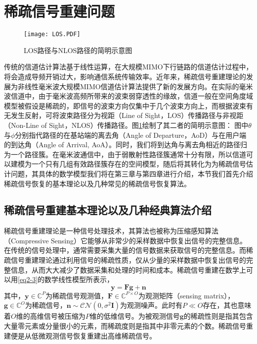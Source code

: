 \documentclass{xdupgthesis}
\begin{document}
\section{稀疏信号重建问题}
\begin{figure}[!ht]
    \centering
    \texttt{[image: LOS.PDF]}
    \caption{LOS路径与NLOS路径的简明示意图}
    \label{LOS}
\end{figure}
传统的信道估计算法基于线性运算，在大规模MIMO下行链路的信道估计过程中，将会造成导频开销过大，影响通信系统传输效率。近年来，稀疏信号重建理论的发展为非线性毫米波大规模MIMO信道估计算法提供了新的发展方向。在实际的毫米波信道中，由于毫米波高频所带来的波束弱穿透性的缘故，信道一般在空间角度域模型被假设是稀疏的，即信号的波束方向仅集中于几个波束方向上，而根据波束有无发生反射，可将波束路径分为视距（Line of Sight，LOS）传播路径与非视距（Non-Line of Sight，NLOS）传播路径。图\ref{LOS}绘制了其二者的简明示意图：
图中$\theta$与$\phi$分别指代路径的在基站端的离去角（Angle of Departure，AoD）与在用户端的到达角（Angle of Arrival, AoA）。同时，我们将到达角与离去角相近的路径归为一个路径簇。在毫米波通信中，由于弱散射性路径簇通常十分有限，所以信道可以建模为一个只有几组有效路径簇存在的空间模型，随后将其转化为为稀疏信号估计问题，其具体的数学模型我们将在第三章与第四章进行介绍，本节我们首先介绍稀疏信号恢复的基本理论以及几种常见的稀疏信号恢复算法。

\subsection{稀疏信号重建基本理论以及几种经典算法介绍}
稀疏信号重建理论是一种信号处理技术，其算法也被称为压缩感知算法（Compressive Sensing）它能够从非常少的采样数据中恢复出信号的完整信息。在传统的信号处理中，通常需要采集大量的信号数据来获取信号的完整信息。而稀疏信号重建理论通过利用信号的稀疏性质，仅从少量的采样数据中恢复出信号的完整信息，从而大大减少了数据采集和处理的时间和成本。稀疏信号重建在数学上可以用\eqref{eq2-3}的数学线性模型所表示，
\begin{equation}
    \label{eq2-3}
    \mathbf{y} = \mathbf{F}\mathbf{g}+\mathbf{n}
\end{equation}
其中，$\mathbf{y} \in \mathbb{C}^{P}$为稀疏信号观测值，$\mathbf{F}\in \mathbb{C}^{P\times O}$为观测矩阵（sensing matrix），$\mathbf{g} \in \mathbb{C}^{O}$为稀疏信号，$\mathbf{n} \sim \mathcal{CN}(0,\sigma^2\mathbf{I})$为观测噪声。此时有$P \ll O$存在，其也意味着$O$维的高维信号被压缩为$P$维的低维信号。为被观测信号$\mathbf{g}$的稀疏性则是指其包含大量零元素或分量很小的元素，而稀疏度则是指其中非零元素的个数。稀疏信号重建便是从低微观测信号恢复重建出高维稀疏信号。
\end{document}
